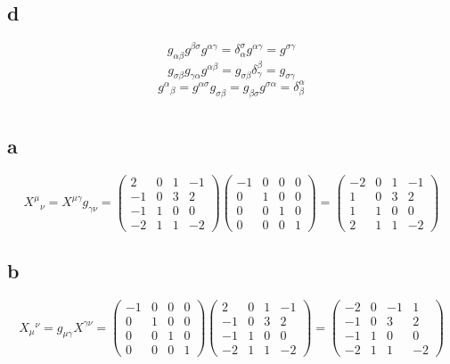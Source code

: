 \documentclass{article}
\begin{document}
\subsection*{d}
\[g_{\alpha\beta}g^{\beta\sigma}g^{\alpha\gamma} = \delta_{\alpha}^\sigma g^{\alpha\gamma} = g^{\sigma\gamma}\]
\[g_{\sigma\beta} g_{\gamma\alpha} g^{\alpha\beta} = g_{\sigma\beta} \delta_{\gamma}^\beta  = g_{\sigma\gamma}\]
\[g^\alpha{}_\beta = g^{\alpha\sigma} g_{\sigma\beta} = g_{\beta\sigma}g^{\sigma\alpha} = \delta_\beta^\alpha \]

\section{}
\subsection*{a}
\[
	X^{\mu}{}_{\nu} = X^{\mu\gamma}{g}_{\gamma\nu}
	= \begin{pmatrix}
		2 & 0 & 1 & -1 \\
		-1 & 0 & 3 & 2 \\
		-1 & 1 & 0 & 0 \\
		-2 & 1 & 1 & -2
	\end{pmatrix}
	\begin{pmatrix}
		-1 & 0 & 0 & 0 \\
		0 & 1 & 0 & 0 \\
		0 & 0 & 1 & 0 \\
		0 & 0 & 0 & 1
	\end{pmatrix}
	= \begin{pmatrix}
		-2 & 0 & 1 & -1 \\
		1 & 0 & 3 & 2 \\
		1 & 1 & 0 & 0 \\
		2 & 1 & 1 & -2
	\end{pmatrix}
\]

\subsection*{b}
\[
	X_{\mu}{}^{\nu} = g_{\mu\gamma}X^{\gamma\nu}
	= \begin{pmatrix}
		-1 & 0 & 0 & 0 \\
		0 & 1 & 0 & 0 \\
		0 & 0 & 1 & 0 \\
		0 & 0 & 0 & 1
	\end{pmatrix}
	\begin{pmatrix}
		2 & 0 & 1 & -1 \\
		-1 & 0 & 3 & 2 \\
		-1 & 1 & 0 & 0 \\
		-2 & 1 & 1 & -2
	\end{pmatrix}
	= \begin{pmatrix}
		-2 & 0 & -1 & 1 \\
		-1 & 0 & 3 & 2 \\
		-1 & 1 & 0 & 0 \\
		-2 & 1 & 1 & -2
	\end{pmatrix}
\]
\end{document}
